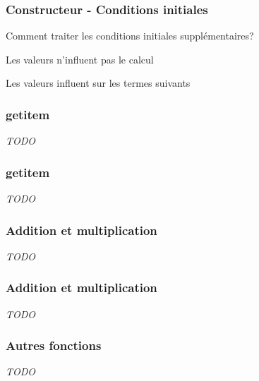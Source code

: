 \documentclass{beamer}
\begin{document}

\begin{frame}
\frametitle{Constructeur - Conditions initiales}
\begin{center}
{\large Comment traiter les conditions initiales supplémentaires?}
\begin{block}{Les valeurs n'influent pas le calcul}
\end{block}
\begin{block}{Les valeurs influent sur les termes suivants}
\end{block}
\end{center}
\end{frame}


\begin{frame}
\frametitle{getitem}
\begin{center}
\emph{TODO}
\end{center}
\end{frame}


\begin{frame}
\frametitle{getitem}
\begin{center}
\emph{TODO}
\end{center}
\end{frame}


\begin{frame}
\frametitle{Addition et multiplication}
\begin{center}
\emph{TODO}
\end{center}
\end{frame}


\begin{frame}
\frametitle{Addition et multiplication}
\begin{center}
\emph{TODO}
\end{center}
\end{frame}


\begin{frame}
\frametitle{Autres fonctions}
\begin{center}
\emph{TODO}
\end{center}
\end{frame}
\end{document}
